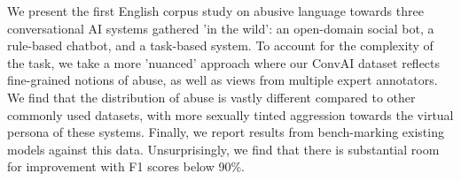 We present the first English corpus study on abusive language towards three conversational AI systems gathered 'in the wild': an open-domain social bot, a rule-based chatbot, and a task-based system. To account for the complexity of the task, we take a more 'nuanced' approach where our ConvAI dataset reflects fine-grained notions of abuse, as well as views from multiple expert annotators. We find that the distribution of abuse is vastly different compared to other commonly used datasets, with more sexually tinted aggression towards the virtual persona of these systems. Finally, we report results from bench-marking existing models against this data. Unsurprisingly, we find that there is substantial room for improvement with F1 scores below 90\%.
